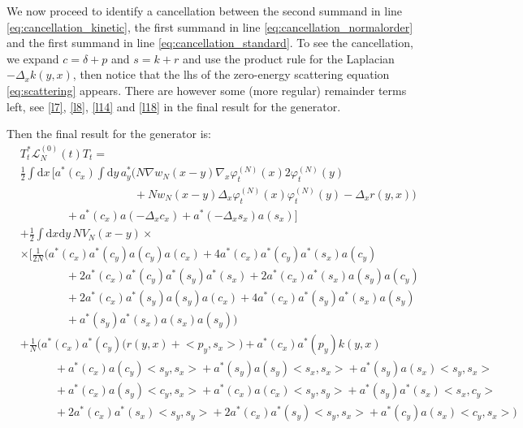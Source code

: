 \documentclass[11pt,a4paper]{scrartcl}
\newcommand{\di}{\textrm{d}}		%
\newcommand{\Lcal}{\mathcal{L}}		%
\newcommand{\scal}[2]{\big<#1,#2\big>} %
\newcommand{\ph}{\varphi_t^{(N)}}	%
\newcommand{\eqr}[1]{\eqref{eq:#1}}			%
\begin{document}
We now proceed to identify a cancellation between the second summand in line \eqr{cancellation_kinetic}, the first summand in line \eqr{cancellation_normalorder} and the first summand in line \eqr{cancellation_standard}. To see the cancellation, we expand $c = \delta + p$ and $s = k + r$ and use the product rule for the Laplacian $-\Delta_x k(y,x)$, then notice that the lhs of the zero-energy scattering equation \eqr{scattering} appears. There are however some (more regular) remainder terms left, see \eqref{l7}, \eqref{l8}, \eqref{l14} and \eqref{l18} in the final result for the generator.

Then the final result for the generator is:
\begin{align}
& T^*_t \Lcal_N^{(0)}(t) T_t = \nonumber \\ 
& \frac{1}{2} \int \di x\, \bigg[ a^*(c_x) \int \di y\, a^*_y \Big( N \nabla w_N(x-y) \nabla_x \ph(x) 2 \ph(y) \label{l7}\\
& \qquad\qquad \qquad\qquad \qquad	+ Nw_N(x-y) \Delta_x \ph(x) \ph(y) - \Delta_x r(y,x) \Big) \label{l8}\\
& \qquad\qquad 			+ a^*(c_x) a(-\Delta_x c_x) + a^*(-\Delta_x s_x) a(s_x) \bigg] \label{l9} \\
& + \frac{1}{2}\int \di x \di y\, NV_N(x-y) \times \nonumber \\
& \times \Big[   \frac{1}{2N}\bigg( a^*(c_x) a^*(c_y) a(c_y) a(c_x) + 4 a^*(c_x) a^*(c_y) a^*(s_x) a(c_y) \label{l10}\\
				      & \qquad\qquad + 2 a^*(c_x) a^*(c_y) a^*(s_y) a^*(s_x) + 2 a^*(c_x) a^*(s_x) a(s_y) a(c_y) \label{l11}\\
				      & \qquad\qquad + 2 a^*(c_x) a^*(s_y) a(s_y) a(c_x) + 4 a^*(c_x) a^*(s_y) a^*(s_x) a(s_y) \label{l12}\\
				      & \qquad\qquad + a^*(s_y) a^*(s_x) a(s_x) a(s_y) \bigg) \label{l13}\\
& + \frac{1}{N}\bigg(   a^*(c_x) a^*(c_y) \Big( r(y,x) + \scal{p_y}{s_x} \Big) + a^*(c_x) a^*(p_y) k(y,x) \label{l14} \\
      & \qquad\quad + a^*(c_x) a(c_y) \scal{s_y}{s_x} + a^*(s_y) a(s_y) \scal{s_x}{s_x} + a^*(s_y) a(s_x) \scal{s_y}{s_x} \label{l15}\\
      & \qquad\quad + a^*(c_x) a(s_y) \scal{c_y}{s_x} + a^*(c_x) a(c_x) \scal{s_y}{s_y} + a^*(s_y) a^*(s_x) \scal{s_x}{c_y} \label{l16}\\
      & \qquad\quad + 2a^*(c_x) a^*(s_x) \scal{s_y}{s_y} + 2a^*(c_x)a^*(s_y) \scal{s_y}{s_x} + a^*(c_y) a(s_x) \scal{c_y}{s_x}    \bigg) \label{l17}\\

\end{align}
\end{document}
